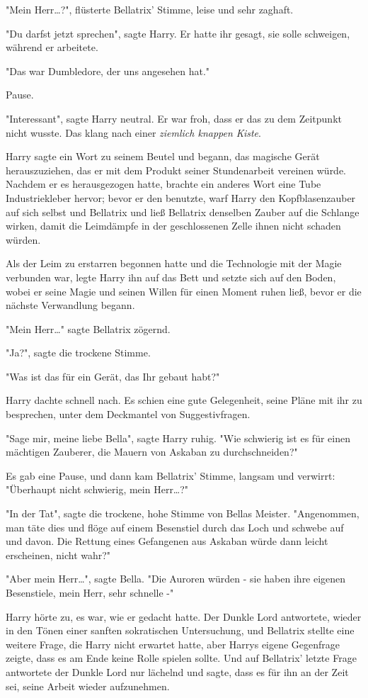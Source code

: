 {"Mein Herr…?", flüsterte Bellatrix' Stimme, leise und sehr zaghaft.

"Du darfst jetzt sprechen", sagte Harry. Er hatte ihr gesagt, sie solle schweigen, während er arbeitete.

"Das war Dumbledore, der uns angesehen hat."

Pause.

"Interessant", sagte Harry neutral. Er war froh, dass er das zu dem Zeitpunkt nicht wusste. Das klang nach einer \emph{ziemlich knappen Kiste}.

Harry sagte ein Wort zu seinem Beutel und begann, das magische Gerät herauszuziehen, das er mit dem Produkt seiner Stundenarbeit vereinen würde. Nachdem er es herausgezogen hatte, brachte ein anderes Wort eine Tube Industriekleber hervor; bevor er den benutzte, warf Harry den Kopfblasenzauber auf sich selbst und Bellatrix und ließ Bellatrix denselben Zauber auf die Schlange wirken, damit die Leimdämpfe in der geschlossenen Zelle ihnen nicht schaden würden.

Als der Leim zu erstarren begonnen hatte und die Technologie mit der Magie verbunden war, legte Harry ihn auf das Bett und setzte sich auf den Boden, wobei er seine Magie und seinen Willen für einen Moment ruhen ließ, bevor er die nächste Verwandlung begann.

"Mein Herr…" sagte Bellatrix zögernd.

"Ja?", sagte die trockene Stimme.

"Was ist das für ein Gerät, das Ihr gebaut habt?"

Harry dachte schnell nach. Es schien eine gute Gelegenheit, seine Pläne mit ihr zu besprechen, unter dem Deckmantel von Suggestivfragen.

"Sage mir, meine liebe Bella", sagte Harry ruhig. "Wie schwierig ist es für einen mächtigen Zauberer, die Mauern von Askaban zu durchschneiden?"

Es gab eine Pause, und dann kam Bellatrix' Stimme, langsam und verwirrt: "Überhaupt nicht schwierig, mein Herr…?"

"In der Tat", sagte die trockene, hohe Stimme von Bellas Meister. "Angenommen, man täte dies und flöge auf einem Besenstiel durch das Loch und schwebe auf und davon. Die Rettung eines Gefangenen aus Askaban würde dann leicht erscheinen, nicht wahr?"

"Aber mein Herr…", sagte Bella. "Die Auroren würden - sie haben ihre eigenen Besenstiele, mein Herr, sehr schnelle -"

Harry hörte zu, es war, wie er gedacht hatte. Der Dunkle Lord antwortete, wieder in den Tönen einer sanften sokratischen Untersuchung, und Bellatrix stellte eine weitere Frage, die Harry nicht erwartet hatte, aber Harrys eigene Gegenfrage zeigte, dass es am Ende keine Rolle spielen sollte. Und auf Bellatrix' letzte Frage antwortete der Dunkle Lord nur lächelnd und sagte, dass es für ihn an der Zeit sei, seine Arbeit wieder aufzunehmen.

}
